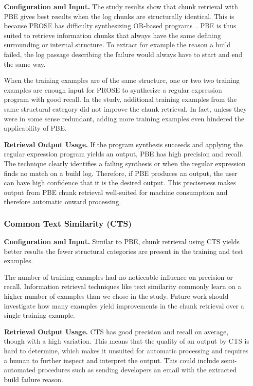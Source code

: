 \noindent
\textbf{Configuration and Input.}
The study results show that chunk retrieval with PBE gives best
results when the log chunks are structurally identical.
This is
because PROSE has difficulty synthesizing OR-based
programs~\cite{mayer2015user}.
PBE is thus suited to retrieve information
chunks that always have the same defining surrounding or internal
structure.
To extract for example the reason a build failed, the log
passage describing the failure would always have to start and
end the same way.

When the training examples are of the same structure, one or two
two training examples are enough input for PROSE to synthesize a regular
expression program with good recall.
In the study, additional training
examples from the same structural category
did not improve the chunk retrieval.
In fact, unless they
were in some sense redundant, adding more training examples even
hindered the applicability of PBE.

\noindent
\textbf{Retrieval Output Usage.}
If the program synthesis succeeds and applying the regular expression
program yields an output, PBE has high precision and recall.
The technique
clearly identifies a failing synthesis or when the regular expression
finds no match on a build log.
Therefore, if PBE produces
an output, the user can have high confidence that it is the desired
output.
This preciseness makes output from PBE chunk retrieval
well-suited for machine consumption and therefore automatic onward
processing.

\subsubsection{Common Text Similarity (CTS)}
\noindent
\textbf{Configuration and Input.}
Similar to PBE, chunk retrieval using CTS yields better results the
fewer structural categories are present in the training and test
examples.

The number of training examples had no noticeable influence on
precision or recall.
Information retrieval techniques
like text similarity commonly learn on a higher number of examples
than we chose in the study.
Future work should investigate how many
examples yield improvements in the chunk retrieval over a single
training example.

\noindent
\textbf{Retrieval Output Usage.}
CTS has good precision and recall on average, though with a high
variation.
This means that the quality of an output by CTS is hard to
determine, which makes it unsuited for automatic processing and requires
a human to further inspect and interpret the output.
This could include semi-automated procedures such as sending
developers an email with the extracted build failure reason.

